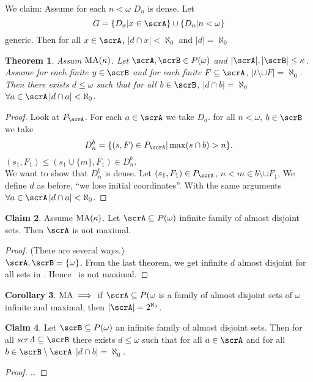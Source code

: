 \documentclass[11pt,pdftex,twoside,a4paper]{article}
\newcommand{\MA}{\ensuremath{\mathop{\rm MA}\nolimits}}
\newtheorem{thm}{Theorem}[section]
\theoremstyle{definition}
\newtheorem{claim}[thm]{Claim}
\newtheorem{corollary}[thm]{Corollary}
\begin{document}
We claim: Assume for each \(n<\omega\) \(D_n\) is dense.
Let
\begin{equation*}
G = \{D_x| x\in\scrA\} \cup \{D_n | n < \omega\}
\end{equation*}
generic.
Then for all \(x\in\scrA\), \(|d\cap x|< \aleph_0\) and \(|d|=\aleph_0\)

\begin{thm}
Assum \(\MA(\kappa)\). Let \(\scrA,\scrB\in P(\omega)\) and 
\(|\scrA|,|\scrB| \leq \kappa\).
Assume for each finite \(y\in\scrB\) and for each finite \(F\subseteq \scrA\),
\(|t\setminus \cup F|=\aleph_0\).
Then there exists \(d\leq \omega\) such that for all \(b\in\scrB\),
\(|d\cap b|=\aleph_0\) 
\(\forall a\in\scrA\, |d\cap a|<\aleph_0\).
\end{thm}
\begin{proof}
Look at \(P_\scrA\). For each \(a\in\scrA\) we take \(D_a\).
for all \(n<\omega\), \(b\in\scrB\) we take
\begin{equation*}
D_n^b = \{(s,F)\in P_\scrA | \max(s\cap b) > n\}.
\end{equation*}
\((s_1,F_1)\leq(s_1\cup\{m\},F_1) \in D_n^b\).
\\
We want to show that \(D_n^b\) is dense.
Let \((s_1,F_1)\in P_\scrA\), \(n < m\in b \setminus \cup F_1\),
We define $d$ as before, ``we lose initial coordinates''.
With the same arguments \(\forall a\in\scrA\, |d\cap a|<\aleph_0\).
\end{proof}

\begin{claim}
Assume \(\MA(\kappa)\). Let \(\scrA \subseteq P(\omega)\)
infinite family of almost disjoint sets. Then \(\scrA\) is not maximal.
\end{claim}
\begin{proof}
(There are several ways.)\\
\(\scrA,\scrB=\{\omega\}\).
From the last theorem, we get infinite $d$ almost disjoint 
for all sets in \scrA. Hence \scrA\ is not maximal.
\end{proof}

\begin{corollary}
\(\MA \implies\) if \(\scrA \subseteq P(\omega\) is a family
of almost disjoint sets of \(\omega\) infinite and maximal, then
\(|\scrA| = 2^{\aleph_0}\).
\end{corollary}

\begin{claim}
Let \(\scrB \subseteq P(\omega)\) an infinite family of 
almost disjoint sets. Then for all \(scrA \subseteq \scrB\)
there exists \(d \leq \omega\) such that for all \(a\in\scrA\)
and for all \(b\in \scrB\setminus\scrA\) \(|d\cap b|=\aleph_0\).
\end{claim}
\begin{proof}
\ldots
\end{proof}
\end{document}
